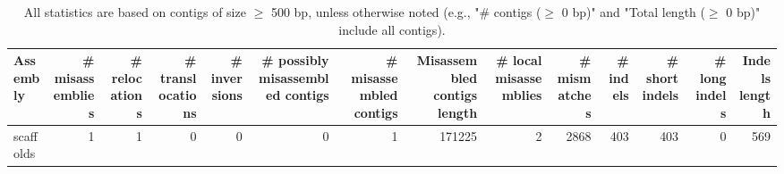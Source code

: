 \documentclass[12pt,a4paper]{article}
\begin{document}
\begin{table}[ht]
\begin{center}
\caption{All statistics are based on contigs of size $\geq$ 500 bp, unless otherwise noted (e.g., "\# contigs ($\geq$ 0 bp)" and "Total length ($\geq$ 0 bp)" include all contigs).}
\begin{tabular}{|l*{13}{|r}|}
\hline
Assembly & \# misassemblies &     \# relocations &     \# translocations &     \# inversions & \# possibly misassembled contigs & \# misassembled contigs & Misassembled contigs length & \# local misassemblies & \# mismatches & \# indels &     \# short indels &     \# long indels & Indels length \\ \hline
scaffolds & 1 & 1 & 0 & 0 & 0 & 1 & 171225 & 2 & 2868 & 403 & 403 & 0 & 569 \\ \hline
\end{tabular}
\end{center}
\end{table}
\end{document}

